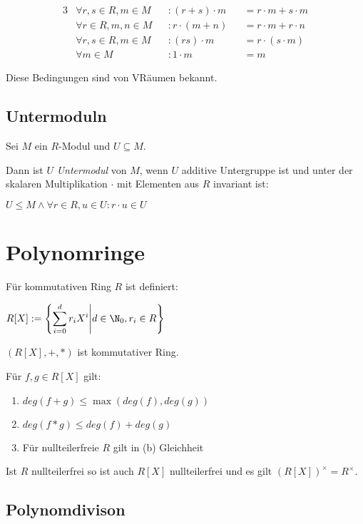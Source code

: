 \vspace*{-4mm}
\begin{alignat*}{3}
	&\forall r, s \in R, m \in M &&: (r+s)\cdot m &&= r\cdot m + s\cdot m \\
	&\forall r \in R, m, n \in M &&: r \cdot (m+n) &&= r\cdot m + r\cdot n \\
	&\forall r, s \in R, m \in M &&: (rs)\cdot m &&= r\cdot(s\cdot m) \\
	&\forall m \in M &&: 1\cdot m &&= m
\end{alignat*}

Diese Bedingungen sind von VRäumen bekannt.

\subsection*{Untermoduln}

Sei $M$ ein $R$-Modul und $U \subseteq M$.

Dann ist $U$ \emph{Untermodul} von $M$, wenn $U$ additive Untergruppe ist und unter der skalaren Multiplikation $\cdot$ mit Elementen aus $R$ invariant ist:

$U \leq M \land \forall r \in R, u \in U : r \cdot u \in U$

\section*{Polynomringe}

Für kommutativen Ring $R$ ist definiert:

$R[X] := \left\{ \displaystyle\sum_{i=0}^d r_i X^i \middle| d \in \N_0, r_i \in R \right\}$

$(R[X], +, *)$ ist kommutativer Ring.

Für $f, g \in R[X]$ gilt:

\begin{enumerate}[label=(\alph*)]
	\item $deg(f+g) \leq \max(deg(f),deg(g))$
	\item $deg(f*g) \leq deg(f) + deg(g)$
	\item Für nullteilerfreie $R$ gilt in (b) Gleichheit
\end{enumerate}

Ist $R$ nullteilerfrei so ist auch $R[X]$ nullteilerfrei und es gilt $(R[X])^\times = R^\times$.

\subsection*{Polynomdivison}

